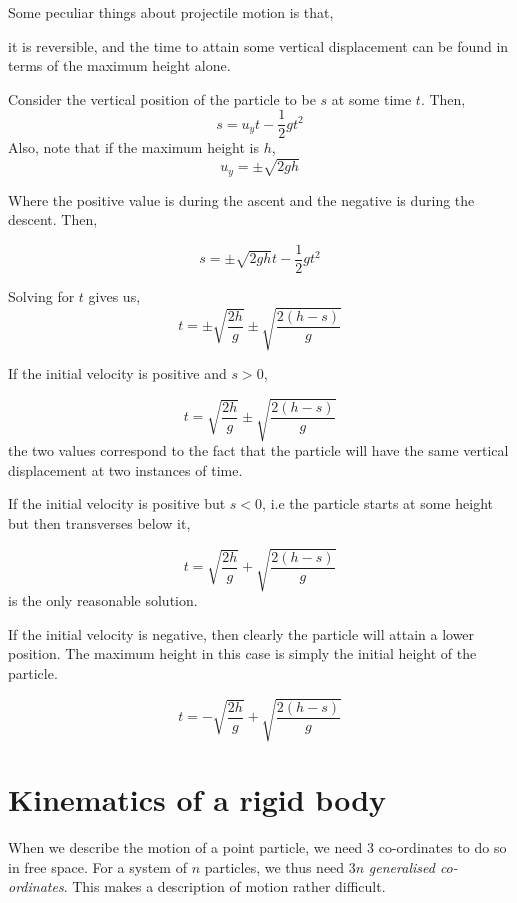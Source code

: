 Some peculiar things about projectile motion is that, \begin{inparaenum}[a)]
    \ii it is reversible, and
    \ii the time to attain some vertical displacement can be found in terms of 
    the maximum height alone.
\end{inparaenum}

Consider the vertical position of the particle to be 
\(s\) at some time \(t\). Then, 
\[s = u_yt - \frac{1}{2}gt^2\] 
Also, note that if the maximum height is \(h\), 
\[u_y = \pm \sqrt{2gh}\]

Where the positive value is during the ascent and the negative is during the descent. Then,

\[s = \pm\sqrt{2gh}t - \frac{1}{2}gt^2\]

Solving for \(t\) gives us,
\[t = \pm \sqrt{\frac{2h}{g}} \pm \sqrt{\frac{2(h-s)}{g}}\]

If the initial velocity is positive and \(s > 0\), 

\begin{equation}
    t = \sqrt{\frac{2h}{g}} \pm \sqrt{\frac{2(h-s)}{g}}
\end{equation}
the two values correspond to the fact that the particle will have the same vertical
displacement at two instances of time.

If the initial velocity is positive but \(s < 0\), i.e the particle 
starts at some height but then transverses below it, 

\begin{equation}
    t = \sqrt{\frac{2h}{g}} + \sqrt{\frac{2(h-s)}{g}}
\end{equation}
is the only reasonable solution.

If the initial velocity is negative, then clearly the 
particle will attain a lower position. The maximum height in this 
case is simply the initial height of the particle.

\begin{equation}
    t = - \sqrt{\frac{2h}{g}} + \sqrt{\frac{2(h-s)}{g}}
\end{equation}


\section{Kinematics of a rigid body}

When we describe the motion of a point particle, we need \(3\) co-ordinates 
to do so in free space. For a system of \(n\) particles, we thus need
\(3n\) \emph{generalised co-ordinates}. This makes a description of motion
rather difficult. 

